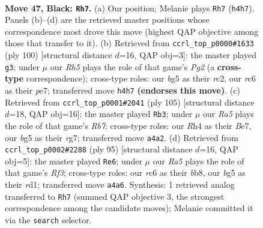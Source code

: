 \documentclass[11pt]{article}
\begin{document}
\clearpage

\begin{figure}[p]\centering
\begin{subfigure}{0.46\textwidth}\centering
\resizebox{\linewidth}{!}{%
\newchessgame
\chessboard[
  setfen={4k3/8/1pR3p1/6B1/rp1P3r/3K4/8/8 b - - 0 47},
  showmover=false,
  pgfstyle=straightmove, color=movearrow, markmove={h4-h7}
]}
\caption{}
\end{subfigure}\hfill
\begin{subfigure}{0.46\textwidth}\centering
\resizebox{\linewidth}{!}{%
\newchessgame
\chessboard[
  setfen={8/4p3/6k1/1R5p/7P/1P6/2r3P1/6K1 w - - 0 51},
  showmover=false,
  pgfstyle=straightmove, color=movearrow, markmove={g2-g3}
]}
\caption{}
\end{subfigure}
\\[4pt]
\begin{subfigure}{0.46\textwidth}\centering
\resizebox{\linewidth}{!}{%
\newchessgame
\chessboard[
  setfen={8/4b1R1/4P3/1p5k/3p1p2/P2B4/1r6/4K3 b - - 6 53},
  showmover=false,
  pgfstyle=straightmove, color=movearrow, markmove={b2-b3}
]}
\caption{}
\end{subfigure}\hfill
\begin{subfigure}{0.46\textwidth}\centering
\resizebox{\linewidth}{!}{%
\newchessgame
\chessboard[
  setfen={1B6/7k/3p1r2/1P6/r3P3/4K3/6P1/3R4 b - - 3 48},
  showmover=false,
  pgfstyle=straightmove, color=movearrow, markmove={f6-e6}
]}
\caption{}
\end{subfigure}
\caption{\textbf{Move 47, Black: \texttt{Rh7}.} (a) Our position; Melanie plays \texttt{Rh7} (\texttt{h4h7}). Panels (b)--(d) are the retrieved master positions whose correspondence most drove this move (highest QAP objective among those that transfer to it). (b) Retrieved from \texttt{ccrl\_top\_p0000\#1633} (ply 100) [structural distance $d$=16, QAP obj=3]: the master played \texttt{g3}; under $\mu$ our \emph{Rh5} plays the role of that game's \emph{Pg2} (a \textbf{cross-type} correspondence); cross-type roles: our \emph{b}g5 as their \emph{r}c2, our \emph{r}c6 as their \emph{p}e7; transferred move \texttt{h4h7} \textbf{(endorses this move)}. (c) Retrieved from \texttt{ccrl\_top\_p0001\#2041} (ply 105) [structural distance $d$=18, QAP obj=16]: the master played \texttt{Rb3}; under $\mu$ our \emph{Ra5} plays the role of that game's \emph{Rb7}; cross-type roles: our \emph{R}h4 as their \emph{B}e7, our \emph{b}g5 as their \emph{r}g7; transferred move \texttt{a4a2}. (d) Retrieved from \texttt{ccrl\_top\_p0002\#2288} (ply 95) [structural distance $d$=16, QAP obj=5]: the master played \texttt{Re6}; under $\mu$ our \emph{Ra5} plays the role of that game's \emph{Rf3}; cross-type roles: our \emph{r}c6 as their \emph{b}b8, our \emph{b}g5 as their \emph{r}d1; transferred move \texttt{a4a6}. Synthesis: 1 retrieved analog transferred to \texttt{Rh7} (summed QAP objective 3, the strongest correspondence among the candidate moves); Melanie committed it via the \texttt{search} selector.}
\label{fig:thought-m93}
\end{figure}
\end{document}
